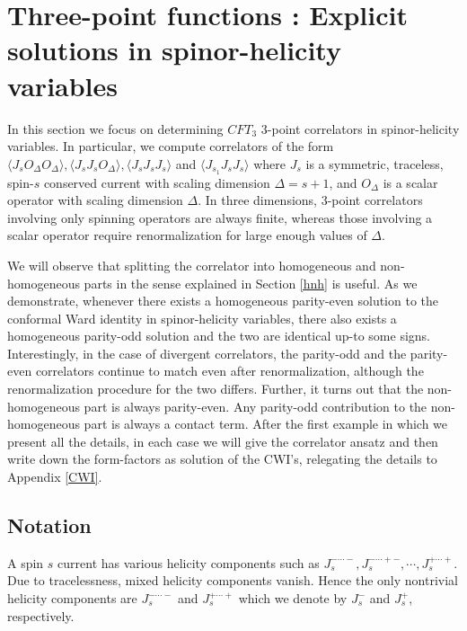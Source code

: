 \documentclass[a4paper,11pt]{article}
\begin{document}
\section{Three-point functions : Explicit solutions in spinor-helicity variables}
\label{sectionSHresults}
In this section we focus on determining $CFT_3$ 3-point correlators in spinor-helicity variables. In particular, we compute correlators of the form $\langle J_s O_{\Delta} O_{\Delta}\rangle,\langle J_s J_s O_{\Delta}\rangle,\langle J_s J_s J_s\rangle$ and $\langle J_{s_1} J_s J_s\rangle$ where $J_s$ is a symmetric, traceless, spin-$s$ conserved current  with scaling dimension $\Delta=s+1$, and $O_{\Delta}$ is a scalar operator with scaling dimension $\Delta$. In three dimensions, 3-point correlators involving only spinning operators are always finite, whereas those involving a scalar operator require renormalization for large enough values of $\Delta$.

We will observe that splitting the correlator into homogeneous and non-homogeneous parts in the sense explained in Section \ref{hnh} is useful. As we demonstrate, whenever there exists a homogeneous parity-even solution to the conformal Ward identity in spinor-helicity variables, there also exists a homogeneous parity-odd solution and the two are identical up-to some signs. Interestingly, in the case of divergent correlators, the parity-odd and the parity-even correlators continue to match even after renormalization, although the renormalization procedure for the two differs. Further, it turns out that the non-homogeneous part is always parity-even. Any parity-odd contribution to the non-homogeneous part is always a contact term. After the first example in which we present all the details, in each case we will give the correlator ansatz and then write down the form-factors as solution of the CWI's, relegating the details to Appendix \ref{CWI}.

\subsection*{Notation}
 A spin $s$ current has various helicity components such as 
$J_s^{-\cdots -},J_s^{-\cdots +-},\cdots, J_s^{+\cdots+}$. Due to tracelessness, mixed helicity components vanish. Hence the only nontrivial helicity components are 
$J_s^{-\cdots-}$ and $ J_s^{+\cdots +}$ which we denote by $J_s^{-}$ and $J_s^{+}$, respectively.
\end{document}
